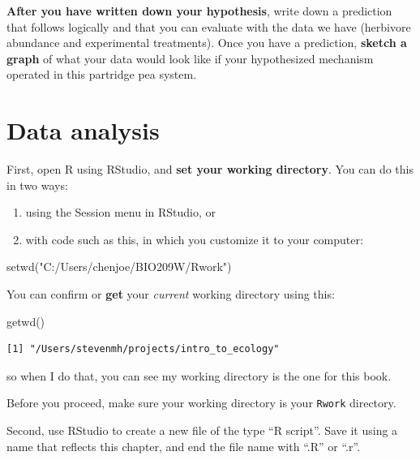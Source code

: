 \documentclass[
  letterpaper,
  DIV=11,
  numbers=noendperiod]{scrreprt}
\newenvironment{Shaded}{\begin{snugshade}}{\end{snugshade}}
\newcommand{\FunctionTok}[1]{\textcolor[rgb]{0.28,0.35,0.67}{#1}}
\newcommand{\NormalTok}[1]{\textcolor[rgb]{0.00,0.23,0.31}{#1}}
\newcommand{\StringTok}[1]{\textcolor[rgb]{0.13,0.47,0.30}{#1}}
\providecommand{\tightlist}{%
  \setlength{\itemsep}{0pt}\setlength{\parskip}{0pt}}
\begin{document}
\textbf{After you have written down your hypothesis}, write down a
prediction that follows logically and that you can evaluate with the
data we have (herbivore abundance and experimental treatments). Once you
have a prediction, \textbf{sketch a graph} of what your data would look
like if your hypothesized mechanism operated in this partridge pea
system.

\section{Data analysis}\label{data-analysis}

First, open R using RStudio, and \textbf{set your working directory}.
You can do this in two ways:

\begin{enumerate}
\def\labelenumi{\arabic{enumi}.}
\tightlist
\item
  using the Session menu in RStudio, or
\item
  with code such as this, in which you customize it to your computer:
\end{enumerate}

\begin{Shaded}
\begin{Highlighting}[]
\FunctionTok{setwd}\NormalTok{(}\StringTok{"C:/Users/chenjoe/BIO209W/Rwork"}\NormalTok{)}
\end{Highlighting}
\end{Shaded}

You can confirm or \textbf{get} your \emph{current} working directory
using this:

\begin{Shaded}
\begin{Highlighting}[]
\FunctionTok{getwd}\NormalTok{()}
\end{Highlighting}
\end{Shaded}

\begin{verbatim}
[1] "/Users/stevenmh/projects/intro_to_ecology"
\end{verbatim}

so when I do that, you can see my working directory is the one for this
book.

Before you proceed, make sure your working directory is your
\texttt{Rwork} directory.

Second, use RStudio to create a new file of the type ``R script''. Save
it using a name that reflects this chapter, and end the file name with
``.R'' or ``.r''.
\end{document}
